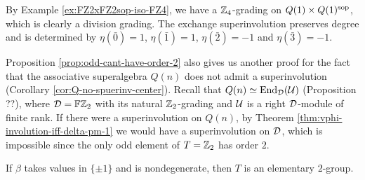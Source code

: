 \begin{ex}%
    By Example \ref{ex:FZ2xFZ2sop-iso-FZ4}, we have a $\mathbb{Z}_4$-grading on $Q(1)\times Q(1)^{\mathrm{sop}}$, which is clearly a division grading. 
    The exchange superinvolution preserves degree and is determined by $\eta (\bar 0) = 1$, $\eta (\bar 1) = 1$, $\eta (\bar 2) = -1$ and $\eta (\bar 3) = -1$.
\end{ex}


    

\begin{remark}
    Proposition \ref{prop:odd-cant-have-order-2} also gives us another proof for the fact that the associative superalgebra $Q(n)$ does not admit a superinvolution (Corollary \ref{cor:Q-no-spuerinv-center}). 
    Recall that $Q(n) \simeq \operatorname{End}_{\mathcal{D}} (\mathcal U)$ (Proposition ??), where $\mathcal{D}= \mathbb{F}\mathbb{Z}_2$ with its natural $\mathbb{Z}_2$-grading and $\mathcal U$ is a right $\mathcal{D}$-module of finite rank. 
    If there were a superinvolution on $Q(n)$, by Theorem \ref{thm:vphi-involution-iff-delta-pm-1} we would have a superinvolution on $\mathcal{D}$, which is impossible since the only odd element of $T = \mathbb{Z}_2$ has order $2$. 
\end{remark}

\begin{lemma}%
    If $\beta$ takes values in $\{ \pm 1 \}$ and is nondegenerate, then $T$ is an elementary $2$-group.
\end{lemma}

